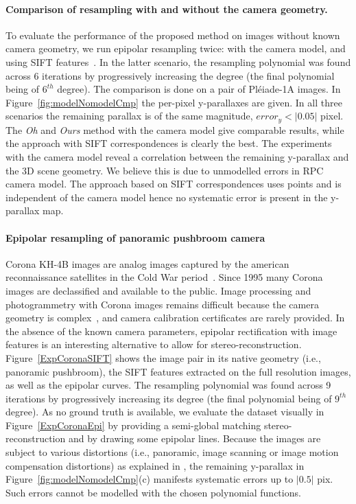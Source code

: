 \documentclass{ipol}
\newcommand{\er}[1]{\textcolor{orange}{#1}}
\begin{document}
 
\paragraph{Comparison of resampling with and without the camera geometry.}
To evaluate the performance of the proposed method on images without known camera geometry, we run epipolar resampling twice: with the camera model, and using SIFT features~\cite{lowe2004distinctive}. In the latter scenario, the resampling polynomial was found across 6 iterations by progressively increasing the degree (the final polynomial being of $6^{th}$ degree). The comparison is done on a pair of Pl\'eiade-1A images. In Figure~\ref{fig:modelNomodelCmp} the per-pixel y-parallaxes are given. In all three scenarios the remaining parallax is of the same magnitude, $error_{y}< |0.05|$ pixel. The \textit{Oh} and \textit{Ours} method with the camera model give comparable results, while the approach with SIFT correspondences is clearly the best. The experiments with the camera model reveal a correlation between the remaining y-parallax and the 3D scene geometry. We believe this is due to unmodelled errors in RPC camera model. The approach based on SIFT correspondences uses points and is independent of the camera model hence no systematic error is present in the y-parallax map. 
%
\paragraph{Epipolar resampling of panoramic pushbroom camera}
%
Corona KH-4B images are analog images captured by the american reconnaissance satellites in the Cold War period~\cite{madden1996corona}. Since 1995 many Corona images are declassified and available to the public. Image processing and photogrammetry with Corona images remains difficult because the camera geometry is complex~\cite{sohn2004mathematical}, and camera calibration certificates are rarely provided. In the absence of the known camera parameters, epipolar rectification with image features is an interesting alternative to allow for stereo-reconstruction. Figure~\ref{ExpCoronaSIFT} shows the image pair in its native geometry (i.e., panoramic pushbroom), the SIFT features extracted on the full resolution images, as well as the epipolar curves. The resampling polynomial was found across 9 iterations by progressively increasing its degree (the final polynomial being of $9^{th}$ degree). As no ground truth is available, we evaluate the dataset visually in Figure~\ref{ExpCoronaEpi} by providing a semi-global matching stereo-reconstruction and by drawing some epipolar lines. Because the images are subject to various distortions (i.e., panoramic, image scanning or image motion compensation distortions) as explained in \cite{gheyle2011scan}, the remaining y-parallax in Figure~\ref{fig:modelNomodelCmp}(c) manifests systematic errors up to $|0.5|$ pix. Such errors cannot be modelled with the chosen polynomial functions.
\end{document}

